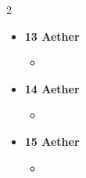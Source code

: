 \begin{multicols}{2}
\begin{itemize}
\begin{itemize}
		\item[] 
	\end{itemize}
	\item[] \textbf{13 Aether}
	\begin{itemize}
		\item[] 
	\end{itemize}
	\item[] \textbf{14 Aether}
	\begin{itemize}
		\item[] 
	\end{itemize}
	\item[] \textbf{15 Aether}
	\begin{itemize}
		\item[] 
	\end{itemize}
\end{itemize}
\end{multicols}

